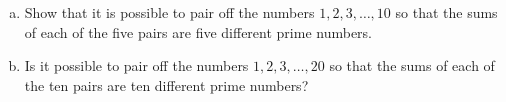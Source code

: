 \documentclass[varwidth]{standalone}
\begin{document}
    \begin{enumerate}[a)]
        \item Show that it is possible to pair off the numbers $1, 2, 3, \dots, 10$ so that the sums of each of the five pairs are five different prime numbers.
        \item Is it possible to pair off the numbers $1, 2, 3, \dots, 20$ so that the sums of each of the ten pairs are ten different prime numbers?
    \end{enumerate}
\end{document}
